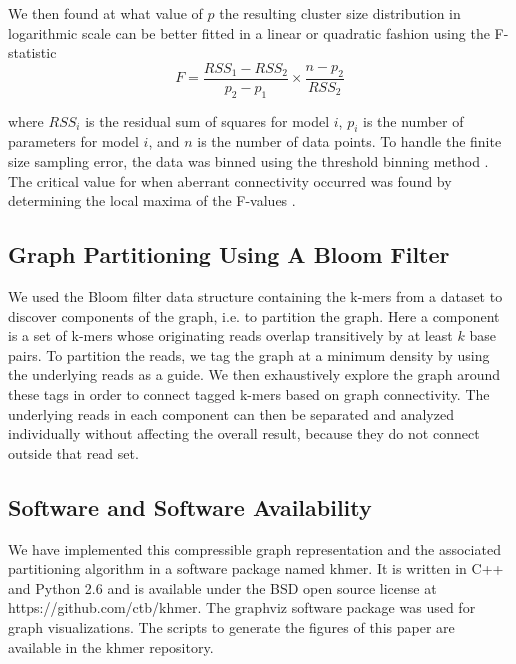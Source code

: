 \documentclass[12pt]{article} \usepackage{simplemargins}
\begin{document}
We then found at what value of $p$ the resulting 
cluster size distribution in logarithmic 
scale can be better fitted in a linear or quadratic fashion using 
the F-statistic
\newline
\newline
\begin{displaymath}
F=\frac{RSS_1-RSS_2}{p_2-p_1} \times \frac{n - p_2}{RSS_2}
\end{displaymath}

where $RSS_i$ is the residual sum of squares for model $i$, $p_i$ is 
the number of parameters for model $i$, and $n$ is the number of data 
points. To handle the finite size sampling error, the data was binned using the 
threshold binning method \cite{adami2002critical}. The critical value for 
when aberrant connectivity occurred was found by determining the local maxima 
of the F-values \cite{wald43}.

\subsection{Graph Partitioning Using A Bloom Filter}
We used the Bloom filter data structure containing the k-mers from a
dataset to discover components of the graph, i.e. to
partition the graph.  Here a component is a set of k-mers
whose originating reads overlap transitively by at least $k$ base
pairs.  To partition the reads, we tag the graph at a minimum density
by using the underlying reads as a guide. We then exhaustively explore
the graph around these tags in order to connect tagged k-mers based on
graph connectivity.  The underlying reads in each component
can then be separated and analyzed individually without affecting the
overall result, because they do not connect outside that read set.


\subsection{Software and Software Availability}

We have implemented this compressible graph representation and the associated
partitioning algorithm in a
software package named khmer.  It is written in C++ and Python 2.6 and
is available under the BSD open source license at
https://github.com/ctb/khmer.  The graphviz software package was used
for graph visualizations. The scripts to generate the figures of this
paper are available in the khmer repository.



\end{document}

